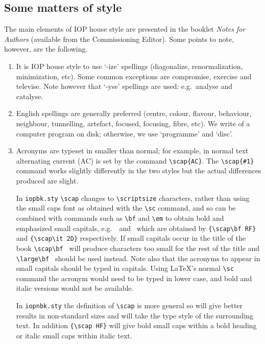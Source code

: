 \subsection{Some matters of style}
The main elements of IOP house style are presented 
in the booklet 
{\it Notes for Authors} (available from the Commissioning Editor).
 Some 
points to note, however, are the following.
\begin{enumerate}
\item It is IOP house style to use `-ize' spellings
(diagonalize, renormalization, minimization, etc). Some 
common exceptions are 
compromise, exercise and televise. Note however that `-yse' spellings are 
used: e.g.\ analyse and catalyse.

\item English spellings are generally preferred (centre, colour, flavour, 
behaviour, neighbour,
tunnelling, artefact, focused, focusing, fibre, etc). We write of a 
computer program on disk; otherwise, we use `programme' and `disc'.

\item Acronyms are typeset in smaller than normal; for example, in normal text alternating current
({\scap AC}) is set by the command \verb"\scap{AC}". 
The \verb"\scap{#1}" command works slightly differently in the two
styles but the actual differences produced are slight.

In \verb"iopbk.sty" \verb"\scap" changes to
\verb"\scriptsize" characters, rather than using the 
small caps font as obtained with the \verb"\sc" command, 
and so can be combined with commands such as \verb"\bf" and
\verb"\em" to obtain bold and emphasized small capitals, e.g.\
\fi\ and 
\fi\ which are obtained 
by \verb"{\scap\bf RF}"
and \verb"{\scap\it 2D}" respectively. 
If small capitals occur in the title
of the book \verb"\scap\bf " will produce characters too small for the rest
of the title and \verb"\large\bf " should be used instead. Note also that
the acronyms to appear in small capitals should be typed in capitals. 
Using \LaTeX's normal \verb"\sc" command the acronym would need to be
typed
in lower case, and bold and italic versions would not be available.

In \verb"iopnbk.sty" the definition of \verb"\scap" is more general
so will give better results in non-standard sizes and will take the type
style of the surrounding text. In addition \verb"{\scap HF}" 
will give bold small
caps within a bold heading or italic small caps within italic text.


\end{enumerate}
